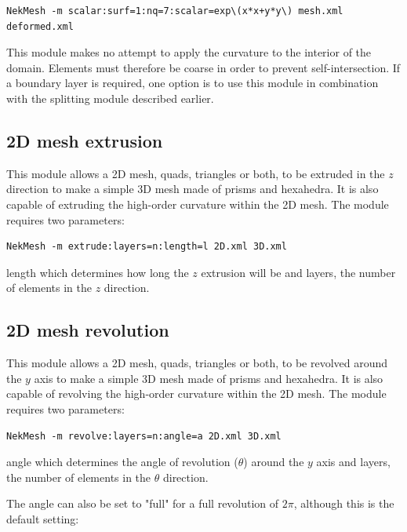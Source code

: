 \begin{lstlisting}[style=BashInputStyle]
  NekMesh -m scalar:surf=1:nq=7:scalar=exp\(x*x+y*y\) mesh.xml deformed.xml
\end{lstlisting}

\begin{notebox}
  This module makes no attempt to apply the curvature to the interior of the
  domain. Elements must therefore be coarse in order to prevent
  self-intersection. If a boundary layer is required, one option is to use this
  module in combination with the splitting module described earlier.
\end{notebox}

\subsection{2D mesh extrusion}

This module allows a 2D mesh, quads, triangles or both, to be extruded in the
$z$ direction to make a simple 3D mesh made of prisms and hexahedra. It is also
capable of extruding the high-order curvature within the 2D mesh. The module
requires two parameters:

\begin{lstlisting}[style=BashInputStyle]
  NekMesh -m extrude:layers=n:length=l 2D.xml 3D.xml
\end{lstlisting}

length which determines how long the $z$ extrusion will be and layers, the
number of elements in the $z$ direction.

\subsection{2D mesh revolution}

This module allows a 2D mesh, quads, triangles or both, to be revolved around
the $y$ axis to make a simple 3D mesh made of prisms and hexahedra. It is also
capable of revolving the high-order curvature within the 2D mesh. The module
requires two parameters:

\begin{lstlisting}[style=BashInputStyle]
  NekMesh -m revolve:layers=n:angle=a 2D.xml 3D.xml
\end{lstlisting}
angle which determines the angle of revolution ($\theta$) around the $y$ axis and 
layers, the number of elements in the $\theta$ direction.

The angle can also be set to "full" for a full revolution of $2\pi$, although
this is the default setting:


